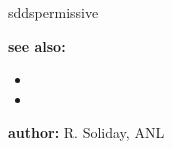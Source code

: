 \begin{sddsprog}{sddspermissive}
\item \textbf{see also:}
\begin{itemize}
\item {}
\item {}
\end{itemize}

\item \textbf{author:} R. Soliday, ANL
\end{sddsprog}

